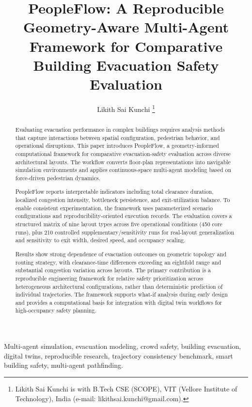 \documentclass[journal]{IEEEtran}
\begin{document}
\title{PeopleFlow: A Reproducible Geometry-Aware Multi-Agent Framework for Comparative Building Evacuation Safety Evaluation}

\author{Likith Sai Kunchi%
\thanks{Likith Sai Kunchi is with B.Tech CSE (SCOPE), VIT (Vellore Institute of Technology), India (e-mail: likithsai.kunchi@gmail.com).}}

\maketitle

\begin{abstract}
Evaluating evacuation performance in complex buildings requires analysis methods that capture interactions between spatial configuration, pedestrian behavior, and operational disruptions. This paper introduces PeopleFlow, a geometry-informed computational framework for comparative evacuation-safety evaluation across diverse architectural layouts. The workflow converts floor-plan representations into navigable simulation environments and applies continuous-space multi-agent modeling based on force-driven pedestrian dynamics.

PeopleFlow reports interpretable indicators including total clearance duration, localized congestion intensity, bottleneck persistence, and exit-utilization balance. To enable consistent experimentation, the framework uses parameterized scenario configurations and reproducibility-oriented execution records. The evaluation covers a structured matrix of nine layout types across five operational conditions (450 core runs), plus 210 controlled supplementary/sensitivity runs for real-layout generalization and sensitivity to exit width, desired speed, and occupancy scaling.

Results show strong dependence of evacuation outcomes on geometric topology and routing strategy, with clearance-time differences exceeding an eightfold range and substantial congestion variation across layouts. The primary contribution is a reproducible engineering framework for relative safety prioritization across heterogeneous architectural configurations, rather than deterministic prediction of individual trajectories. The framework supports what-if analysis during early design and provides a computational basis for integration with digital twin workflows for high-occupancy safety planning.
\end{abstract}

\begin{IEEEkeywords}
Multi-agent simulation, evacuation modeling, crowd safety, building evacuation, digital twins, reproducible research, trajectory consistency benchmark, smart building safety, multi-agent pathfinding.
\end{IEEEkeywords}
\end{document}

